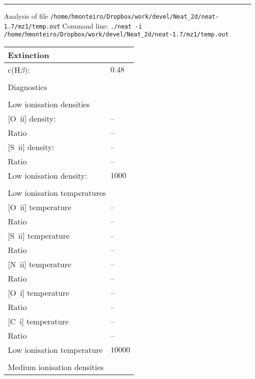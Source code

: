  \hrule
 \vspace{0.3cm}
 \noindent Analysis of file {\tt /home/hmonteiro/Dropbox/work/devel/Neat_2d/neat-1.7/mz1/temp.out}\newline
 \noindent Command line: {\tt ./neat -i /home/hmonteiro/Dropbox/work/devel/Neat_2d/neat-1.7/mz1/temp.out}\newline
 \begin{longtable}[l]{ll}
 \multicolumn{2}{l}{Extinction}\\ \hline
 c(H$\beta)$:                        & $  0.48$\\
 \vspace{0.2cm}\\\multicolumn{2}{l}{Diagnostics}\\ \hline
 \vspace{0.2cm}\\\multicolumn{2}{l}{Low ionisation densities}\\ \hline
 {}[O~{\sc ii}] density:             & -- \\
 Ratio                               & -- \\
 {}[S~{\sc ii}] density:             & -- \\
 Ratio                               & -- \\
 Low ionisation density:             & $ 1000$\\
 \vspace{0.2cm}\\\multicolumn{2}{l}{Low ionisation temperatures}\\ \hline
 {}[O~{\sc ii}] temperature          & -- \\
 Ratio                               & -- \\
 {}[S~{\sc ii}] temperature          & -- \\
 Ratio                               & -- \\
 {}[N~{\sc ii}] temperature          & -- \\
 Ratio                               & -- \\
 {}[O~{\sc i}] temperature           & -- \\
 Ratio                               & -- \\
 {}[C~{\sc i}] temperature           & -- \\
 Ratio                               & -- \\
 Low ionisation temperature          & $10000$\\
 \vspace{0.2cm}\\\multicolumn{2}{l}{Medium ionisation densities}\\ \hline

\end{longtable}
